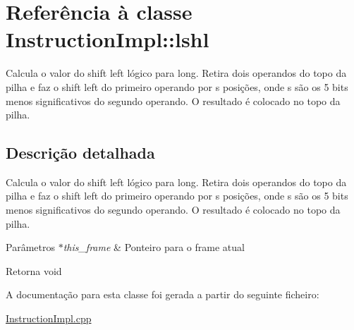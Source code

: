 \hypertarget{class_instruction_impl_1_1lshl}{}\section{Referência à classe Instruction\+Impl\+:\+:lshl}
\label{class_instruction_impl_1_1lshl}


Calcula o valor do shift left lógico para long. Retira dois operandos do topo da pilha e faz o shift left do primeiro operando por s posições, onde s são os 5 bits menos significativos do segundo operando. O resultado é colocado no topo da pilha.  




\subsection{Descrição detalhada}
Calcula o valor do shift left lógico para long. Retira dois operandos do topo da pilha e faz o shift left do primeiro operando por s posições, onde s são os 5 bits menos significativos do segundo operando. O resultado é colocado no topo da pilha. 


\begin{DoxyParams}{Parâmetros}
{\em $\ast$this\+\_\+frame} & Ponteiro para o frame atual \\
\hline
\end{DoxyParams}
\begin{DoxyReturn}{Retorna}
void 
\end{DoxyReturn}


A documentação para esta classe foi gerada a partir do seguinte ficheiro\+:\begin{DoxyCompactItemize}
\item 
\hyperlink{_instruction_impl_8cpp}{Instruction\+Impl.\+cpp}\end{DoxyCompactItemize}
